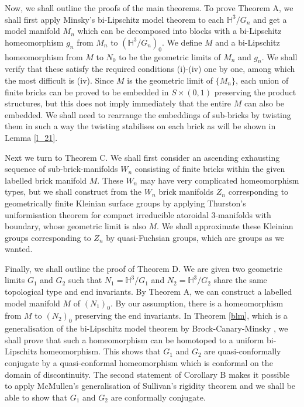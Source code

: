 \documentclass{amsart}
\theoremstyle{definition}
\numberwithin{figure}{section}
\numberwithin{equation}{section}
\newcommand{\blackboard}[1]{\ensuremath{\mathbb{#1}}}
\newcommand{\hyperbolic}{\blackboard{H}}
\begin{document}
Now, we shall outline the proofs of the main theorems.
To prove Theorem A, we shall first apply Minsky's bi-Lipschitz model theorem to each $\hyperbolic^3/G_n$ and get a model manifold $M_n$ which can be decomposed into blocks with a bi-Lipschitz homeomorphism $g_n$ from $M_n$ to $(\hyperbolic^3/G_n)_0$.
We define $M$ and a bi-Lipschitz homeomorphism from $M$ to $N_0$ to be the geometric limits of $M_n$ and $g_n$.
We shall verify that these satisfy the required conditions (i)-(iv) one by one, among which the most difficult is (iv).
Since $M$ is the geometric limit of $\{M_n\}$, each union of finite bricks can be proved to be embedded in $S \times (0,1)$ preserving the product structures, but this does not imply immediately that the entire $M$ can also be embedded.
We shall need to  rearrange the embeddings of sub-bricks by twisting them in such a way the twisting stabilises on each brick as will be shown in Lemma \ref{l_21}.

Next we turn to Theorem C.
We shall first consider an ascending exhausting sequence of sub-brick-manifolds $W_n$ consisting of finite bricks within the given labelled brick manifold $M$.
These $W_n$ may have very complicated homeomorphism types, but we shall construct from the $W_n$   brick manifolds $Z_n$ corresponding  to   geometrically finite Kleinian surface groups by applying Thurston's uniformisation theorem for compact irreducible atoroidal 3-manifolds with boundary, whose geometric limit is also $M$.
We shall approximate these Kleinian groups corresponding to $Z_n$ by quasi-Fuchsian groups, which are groups as we wanted.

Finally, we shall outline the proof of  Theorem D.
We are given two geometric limits $G_1$ and $G_2$ such that $N_1=\hyperbolic^3/G_1$ and $N_2=\hyperbolic^3/G_2$ share the same topological type and end invariants.
By Theorem A, we can construct a labelled model manifold $M$ of $(N_1)_0$.
By our assumption, there is a homeomorphism from $M$ to $(N_2)_0$ preserving the end invariants.
In Theorem \ref{blm}, which is a generalisation of the bi-Lipschitz model theorem by Brock-Canary-Minsky \cite{bcm}, we shall prove that such a homeomorphism can be homotoped to a uniform bi-Lipschitz homeomorphism.
This shows that $G_1$ and $G_2$ are quasi-conformally conjugate by a quasi-conformal homeomorphism which is conformal on the domain of discontinuity.
The second statement of Corollary B makes it possible to apply McMullen's generalisation of Sullivan's rigidity theorem and we shall be able to show that $G_1$ and $G_2$ are conformally conjugate.
\end{document}
